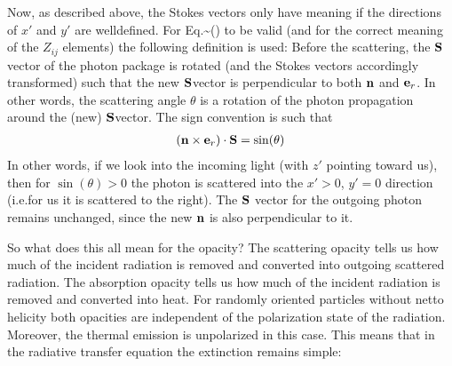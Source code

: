 \documentclass[letterpaper,10pt,english]{sphinxmanual}
\begin{document}
Now, as described above, the Stokes vectors only have meaning if the directions
of \(x'\) and \(y'\) are well\sphinxhyphen{}defined. For
Eq.\textasciitilde{}() to be valid (and for the correct
meaning of the \(Z_{ij}\) elements) the following definition is used: Before
the scattering, the \({\bf S}\)\sphinxhyphen{}vector of the photon package is rotated (and
the Stokes vectors accordingly transformed) such that the new \({\bf
S}\)\sphinxhyphen{}vector is perpendicular to both \({\bf n}\) and \({\bf e}_r\). In
other words, the scattering angle \(\theta\) is a rotation of the photon
propagation around the (new) \({\bf S}\)\sphinxhyphen{}vector. The sign convention is such
that
\begin{equation*}
\begin{split}({\bf n}\times {\bf e}_r)\cdot{\bf S}=\sin(\theta)\end{split}
\end{equation*}
In other words, if we look into the incoming light (with \(z'\) pointing
toward us), then for \(\sin(\theta)>0\) the photon is scattered into the
\(x'>0\), \(y'=0\) direction (i.e.for us it is scattered to the
right).  The \({\bf S}\) vector for the outgoing photon remains unchanged,
since the new \({\bf n}\) is also perpendicular to it.

So what does this all mean for the opacity? The scattering opacity tells us
how much of the incident radiation is removed and converted into outgoing
scattered radiation. The absorption opacity tells us how much of the
incident radiation is removed and converted into heat. For randomly oriented
particles without netto helicity both opacities are independent of the
polarization state of the radiation. Moreover, the thermal emission
is unpolarized in this case. This means that in the radiative
transfer equation the extinction remains simple:
\end{document}
